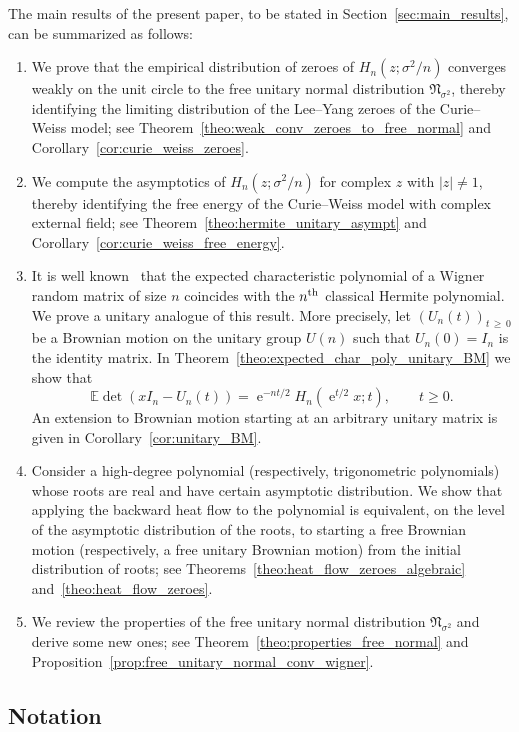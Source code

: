 \documentclass[10pt]{amsart}
\theoremstyle{definition}\newtheorem{defi}[theo]{Definition}\newtheorem{rema}[theo]{Remark}\newtheorem{exam}[theo]{Example}\newtheorem{exem}[theo]{Example}\newtheorem{nota}[theo]{Notation}
\DeclareMathOperator{\eee}{e}
\newcommand{\fnorm}{\mathfrak{N}}
\newcommand{\E}{\mathbb{E}}
\newcommand*{\relabel}{\renewcommand{\labelenumi}{(\theenumi)}}
\newcommand*{\alphenumi}{\renewcommand*{\theenumi}{\alph{enumi}}\relabel}
\begin{document}
The main results of the present paper, to be stated in Section~\ref{sec:main_results}, can be summarized as follows:
\begin{enumerate}\alphenumi
\item We prove that the empirical distribution of zeroes of $H_n(z; \sigma^2/n)$ converges weakly on the unit circle to the free unitary normal distribution $\fnorm_{\sigma^2}$, thereby identifying the limiting distribution of the Lee--Yang zeroes of the Curie--Weiss model; see Theorem~\ref{theo:weak_conv_zeroes_to_free_normal} and Corollary~\ref{cor:curie_weiss_zeroes}.
\item We compute the asymptotics of $H_n (z;\sigma^2/n)$ for complex $z$ with $|z|\neq 1$, thereby identifying the free energy of the Curie--Weiss model with complex external field; see Theorem~\ref{theo:hermite_unitary_asympt} and Corollary~\ref{cor:curie_weiss_free_energy}.
\item It is well known~\cite[Section~6.1.2]{potters_bouchaud_book} that the expected characteristic polynomial of a Wigner random matrix of size $n$ coincides with the $n^{\text{\normalfont th}}$ classical Hermite polynomial. We prove a unitary analogue of this result. More precisely, let $(U_n(t))_{t\,\geq\,0}$ be a Brownian motion on the unitary group $U(n)$ such that $U_n(0)=I_n$ is the identity matrix. In Theorem~\ref{theo:expected_char_poly_unitary_BM} we show that
\[
\E \det (x I_n - U_n(t))= \eee^{-nt/2} H_n\left(\eee^{t/2} x; t\right), \qquad t\geq 0.
\]
An extension to Brownian motion starting at an arbitrary unitary matrix is given in Corollary~\ref{cor:unitary_BM}.
\item Consider a high-degree polynomial (respectively, trigonometric polynomials) whose roots are real and have certain asymptotic distribution. We show that applying the backward heat flow to the polynomial is equivalent, on the level of the asymptotic distribution of the roots, to starting a free Brownian motion (respectively, a free unitary Brownian motion) from the initial distribution of roots; see Theorems~\ref{theo:heat_flow_zeroes_algebraic} and~\ref{theo:heat_flow_zeroes}.
\item We review the properties of the free unitary normal distribution $\fnorm_{\sigma^2}$ and derive some new ones; see Theorem~\ref{theo:properties_free_normal} and Proposition~\ref{prop:free_unitary_normal_conv_wigner}.
\end{enumerate}


\subsection*{Notation} 
\end{document}

